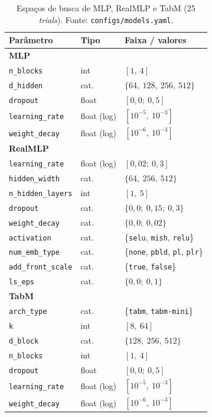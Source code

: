 \begin{table}[htbp]
\centering\footnotesize
\caption[Espaços de busca --- MLPs e \emph{ensembles}
paramétricos]{Espaços de busca de MLP, RealMLP e TabM
(25 \emph{trials}). Fonte: \texttt{configs/\allowbreak models.\allowbreak yaml}.}
\label{tab:app-busca-mlp}
\begin{tabular}{lll}
\toprule
Parâmetro & Tipo & Faixa / valores \\
\midrule
\multicolumn{3}{l}{\textbf{MLP}} \\
\texttt{n\_blocks}      & int   & $[1,\ 4]$ \\
\texttt{d\_hidden}      & cat.  & $\{64,\ 128,\ 256,\ 512\}$ \\
\texttt{dropout}        & float & $[0{,}0;\ 0{,}5]$ \\
\texttt{learning\_rate} & float (log) & $[10^{-5},\ 10^{-3}]$ \\
\texttt{weight\_decay}  & float (log) & $[10^{-6},\ 10^{-3}]$ \\
\midrule
\multicolumn{3}{l}{\textbf{RealMLP}} \\
\texttt{learning\_rate}    & float (log) & $[0{,}02;\ 0{,}3]$ \\
\texttt{hidden\_width}     & cat. & $\{64,\ 256,\ 512\}$ \\
\texttt{n\_\allowbreak hidden\_\allowbreak layers} & int  & $[1,\ 5]$ \\
\texttt{dropout}           & cat. & $\{0{,}0;\ 0{,}15;\ 0{,}3\}$ \\
\texttt{weight\_decay}     & cat. & $\{0{,}0;\ 0{,}02\}$ \\
\texttt{activation}        & cat. & \{\texttt{selu}, \texttt{mish},
  \texttt{relu}\} \\
\texttt{num\_emb\_type}    & cat. & \{\texttt{none}, \texttt{pbld},
  \texttt{pl}, \texttt{plr}\} \\
\texttt{add\_\allowbreak front\_\allowbreak scale} & cat. & \{\texttt{true}, \texttt{false}\} \\
\texttt{ls\_eps}           & cat. & $\{0{,}0;\ 0{,}1\}$ \\
\midrule
\multicolumn{3}{l}{\textbf{TabM}} \\
\texttt{arch\_type}     & cat.  & \{\texttt{tabm}, \texttt{tabm-mini}\} \\
\texttt{k}              & int   & $[8,\ 64]$ \\
\texttt{d\_block}       & cat.  & $\{128,\ 256,\ 512\}$ \\
\texttt{n\_blocks}      & int   & $[1,\ 4]$ \\
\texttt{dropout}        & float & $[0{,}0;\ 0{,}5]$ \\
\texttt{learning\_rate} & float (log) & $[10^{-5},\ 10^{-3}]$ \\
\texttt{weight\_decay}  & float (log) & $[10^{-6},\ 10^{-3}]$ \\
\bottomrule
\end{tabular}
\end{table}

